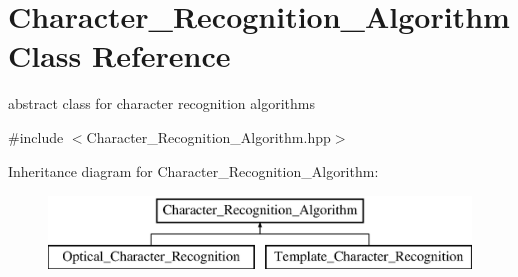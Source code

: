 \hypertarget{class_character___recognition___algorithm}{}\section{Character\+\_\+\+Recognition\+\_\+\+Algorithm Class Reference}
\label{class_character___recognition___algorithm}


abstract class for character recognition algorithms  




{\ttfamily \#include $<$Character\+\_\+\+Recognition\+\_\+\+Algorithm.\+hpp$>$}

Inheritance diagram for Character\+\_\+\+Recognition\+\_\+\+Algorithm\+:\begin{figure}[H]
\begin{center}
\leavevmode
\includegraphics[height=2.000000cm]{class_character___recognition___algorithm}
\end{center}
\end{figure}
